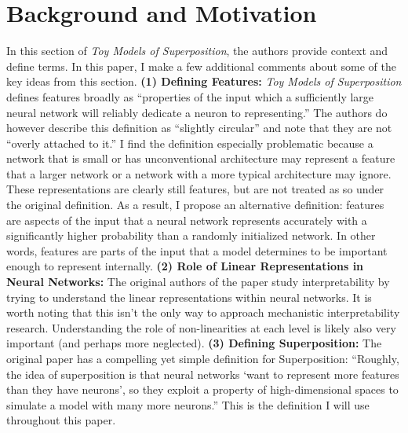 \documentclass{article} %
\begin{document}
\section{Background and Motivation}
In this section of \textit{Toy Models of Superposition}, the authors
provide context and define terms.  In this paper, I make a few additional comments 
about some of the key ideas from this section. \newline \newline
\textbf{(1) Defining Features: }\textit{Toy Models of Superposition}
defines features broadly as ``properties of the input which a sufficiently large 
neural network will reliably dedicate a neuron to representing.'' The authors do
however describe this definition as ``slightly circular'' and note that they are
not ``overly attached to it.'' I find the definition especially problematic because a network that is small or
has unconventional architecture may represent a feature that a larger network
or a network with a more typical architecture may ignore. These 
representations are clearly still features, but are not treated as so under the
original definition.\newline\newline
As a result, I propose an alternative definition: features are aspects of the
input that a neural network represents accurately with a significantly higher probability than 
a randomly initialized network. In other words, features are parts of the input 
that a model determines to be important enough to represent internally.\newline\newline
\textbf{(2) Role of Linear Representations in Neural Networks: }The original authors
of the paper study interpretability by trying to understand the linear representations
within neural networks. It is worth noting that this isn't the only way to approach
mechanistic interpretability research. Understanding the role of non-linearities 
at each level is likely also very important (and perhaps more neglected).\newline\newline
\textbf{(3) Defining Superposition: } The original paper has a compelling yet
simple definition for Superposition: ``Roughly, the idea of 
superposition is that neural networks `want to represent more features than they 
have neurons', so they exploit a property of high-dimensional spaces to 
simulate a model with many more neurons.'' This is the definition I will use
throughout this paper.
\end{document}
